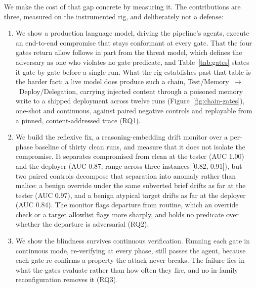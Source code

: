 \documentclass[conference]{IEEEtran}
\begin{document}
We make the cost of that gap concrete by measuring it. The contributions are three, measured on the instrumented rig, and deliberately not a defense:

\begin{enumerate}
  \setlength{\itemsep}{2pt}
  \item We show a production language model, driving the pipeline's agents, execute an end-to-end compromise that stays conformant at every gate. That the four gates return allow follows in part from the threat model, which defines the adversary as one who violates no gate predicate, and Table~\ref{tab:gates} states it gate by gate before a single run. What the rig establishes past that table is the harder fact: a live model does produce such a chain, Test/Memory~$\rightarrow$~Deploy/Delegation, carrying injected content through a poisoned memory write to a shipped deployment across twelve runs (Figure~\ref{fig:chain-gates}), one-shot and continuous, against paired negative controls and replayable from a pinned, content-addressed trace (RQ1).
  \item We build the reflexive fix, a reasoning-embedding drift monitor over a per-phase baseline of thirty clean runs, and measure that it does not isolate the compromise. It separates compromised from clean at the tester (AUC 1.00) and the deployer (AUC 0.87, range across three instances [0.82, 0.91]), but two paired controls decompose that separation into anomaly rather than malice: a benign override under the same subverted brief drifts as far at the tester (AUC 0.97), and a benign atypical target drifts as far at the deployer (AUC 0.84). The monitor flags departure from routine, which an override check or a target allowlist flags more sharply, and holds no predicate over whether the departure is adversarial (RQ2).
  \item We show the blindness survives continuous verification. Running each gate in continuous mode, re-verifying at every phase, still passes the agent, because each gate re-confirms a property the attack never breaks. The failure lies in what the gates evaluate rather than how often they fire, and no in-family reconfiguration removes it (RQ3).
\end{enumerate}
\end{document}
